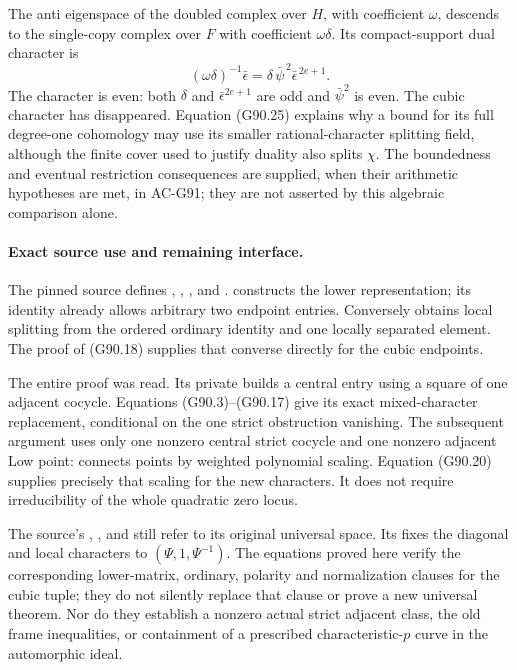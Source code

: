The anti eigenspace of the doubled complex over \(H\), with coefficient
\(\omega\), descends to the single-copy complex over \(F\) with
coefficient \(\omega\delta\).  Its compact-support dual character is
\[
 (\omega\delta)^{-1}\bar\epsilon
       =\delta\,\bar\psi^{\,2}\bar\epsilon^{\,2e+1}.
 \tag{G90.27}
\]
The character is even: both \(\delta\) and
\(\bar\epsilon^{2e+1}\) are odd and \(\bar\psi^2\) is even.
The cubic character has disappeared.  Equation (G90.25) explains
why a bound for its full degree-one cohomology may use its smaller
rational-character splitting field, although the finite cover used
to justify duality also splits \(\chi\).
The boundedness and eventual restriction consequences are supplied,
when their arithmetic hypotheses are met, in AC-G91; they are not
asserted by this algebraic comparison alone.

\paragraph{Exact source use and remaining interface.}
The pinned source  defines ,
, , and .
 constructs the lower
representation; its  identity already allows arbitrary
two endpoint entries.  Conversely
 obtains local splitting
from the ordered ordinary identity and one locally separated element.
The proof of (G90.18) supplies that converse directly for the cubic
endpoints.

The entire  proof was read.
Its private  builds a central entry
using a square of one adjacent cocycle.  Equations (G90.3)--(G90.17)
give its exact mixed-character replacement, conditional on the one
strict obstruction vanishing.  The subsequent
 argument uses only one nonzero
central strict cocycle and one nonzero adjacent Low point:
 connects points by weighted polynomial scaling.
Equation (G90.20) supplies precisely that scaling for the new
characters.  It does not require irreducibility of the whole
quadratic zero locus.

The source's , , and  still
refer to its original universal space.  Its
 fixes the diagonal and local
characters to \((\Psi,1,\Psi^{-1})\).
The equations proved here verify the corresponding lower-matrix,
ordinary, polarity and normalization clauses for the cubic tuple;
they do not silently replace that  clause or prove a
new universal  theorem.  Nor do they establish a
nonzero actual strict adjacent class, the old frame inequalities,
or containment of a prescribed characteristic-\(p\) curve in
the automorphic ideal.

